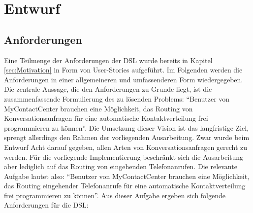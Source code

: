 \chapter{Entwurf}
\label{chap:Entwurf}

\section{Anforderungen}
Eine Teilmenge der Anforderungen der DSL wurde bereits in Kapitel \ref{sec:Motivation} in Form von User-Stories aufgeführt. Im Folgenden werden die Anforderungen in einer allgemeineren und umfassenderen Form wiedergegeben. Die zentrale Aussage, die den Anforderungen zu Grunde liegt, ist die zusammenfassende Formulierung des zu lösenden Problems: ``Benutzer von MyContactCenter brauchen eine Möglichkeit, das Routing von Konversationsanfragen für eine automatische Kontaktverteilung frei programmieren zu können''. Die Umsetzung dieser Vision ist das langfristige Ziel, sprengt allerdings den Rahmen der vorliegenden Ausarbeitung. Zwar wurde beim Entwurf Acht darauf gegeben, allen Arten von Konversationsanfragen gerecht zu werden. Für die vorliegende Implementierung beschränkt sich die Ausarbeitung aber lediglich auf das Routing von eingehenden Telefonanrufen. Die relevante Aufgabe lautet also: ``Benutzer von MyContactCenter brauchen eine Möglichkeit, das Routing eingehender Telefonanrufe für eine automatische Kontaktverteilung frei programmieren zu können''.
\newline
Aus dieser Aufgabe ergeben sich folgende Anforderungen für die DSL:
